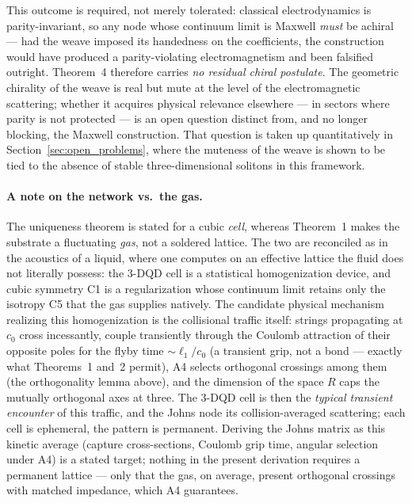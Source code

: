 \documentclass[11pt,a4paper]{article}
\theoremstyle{plain}
\theoremstyle{remark}
\begin{document}
This outcome is required, not merely tolerated: classical electrodynamics is parity-invariant, so any node whose continuum limit is Maxwell \emph{must} be achiral --- had the weave imposed its handedness on the coefficients, the construction would have produced a parity-violating electromagnetism and been falsified outright. Theorem~4 therefore carries \emph{no residual chiral postulate}. The geometric chirality of the weave is real but mute at the level of the electromagnetic scattering; whether it acquires physical relevance elsewhere --- in sectors where parity is not protected --- is an open question distinct from, and no longer blocking, the Maxwell construction. That question is taken up quantitatively in Section~\ref{sec:open_problems}, where the muteness of the weave is shown to be tied to the absence of stable three-dimensional solitons in this framework.

\paragraph{A note on the network vs.\ the gas.} The uniqueness theorem is stated for a cubic \emph{cell}, whereas Theorem~1 makes the substrate a fluctuating \emph{gas}, not a soldered lattice. The two are reconciled as in the acoustics of a liquid, where one computes on an effective lattice the fluid does not literally possess: the 3-DQD cell is a statistical homogenization device, and cubic symmetry C1 is a regularization whose continuum limit retains only the isotropy C5 that the gas supplies natively. The candidate physical mechanism realizing this homogenization is the collisional traffic itself: strings propagating at $c_0$ cross incessantly, couple transiently through the Coulomb attraction of their opposite poles for the flyby time $\sim\ell_1/c_0$ (a transient grip, not a bond --- exactly what Theorems~1 and~2 permit), A4 selects orthogonal crossings among them (the orthogonality lemma above), and the dimension of the space $R$ caps the mutually orthogonal axes at three. The 3-DQD cell is then the \emph{typical transient encounter} of this traffic, and the Johns node its collision-averaged scattering; each cell is ephemeral, the pattern is permanent. Deriving the Johns matrix as this kinetic average (capture cross-sections, Coulomb grip time, angular selection under A4) is a stated target; nothing in the present derivation requires a permanent lattice --- only that the gas, on average, present orthogonal crossings with matched impedance, which A4 guarantees.
\end{document}
